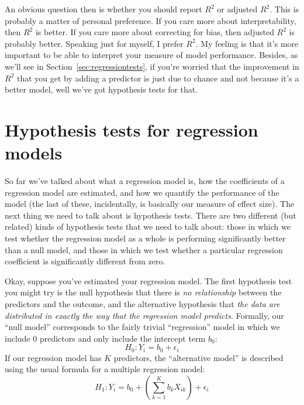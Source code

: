 An obvious question then is whether you should report $R^2$ or adjusted $R^2$. This is probably a matter of personal preference. If you care more about interpretability, then $R^2$ is better. If you care more about correcting for bias, then adjusted $R^2$ is probably better. Speaking just for myself, I prefer $R^2$. My feeling is that it's more important to be able to interpret your measure of model performance. Besides, as we'll see in Section~\ref{sec:regressiontests}, if you're worried that the improvement in $R^2$ that you get by adding a predictor is just due to chance and not because it's a better model, well we've got hypothesis tests for that. 


\section{Hypothesis tests for regression models~\label{sec:regressiontests}}

So far we've talked about what a regression model is, how the coefficients of a regression model are estimated, and how we quantify the performance of the model (the last of these, incidentally, is basically our measure of effect size). The next thing we need to talk about is hypothesis tests. There are two different (but related) kinds of hypothesis tests that we need to talk about: those in which we test whether the regression model as a whole is performing significantly better than a null model, and those in which we test whether a particular regression coefficient is significantly different from zero. 
 


Okay, suppose you've estimated your regression model. The first hypothesis test you might try is the null hypothesis that there is {\it no relationship} between the predictors and the outcome, and the alternative hypothesis that {\it the data are distributed in exactly the way that the regression model predicts.} Formally, our ``null model'' corresponds to the fairly trivial ``regression'' model in which we include 0 predictors and only include the intercept term $b_0$:
$$
H_0: Y_i = b_0 + \epsilon_i
$$
If our regression model has $K$ predictors, the ``alternative model'' is described using the usual formula for a multiple regression model:
$$
H_1: Y_i = b_0 + \left( \sum_{k=1}^K b_{k} X_{ik} \right) + \epsilon_i
$$

